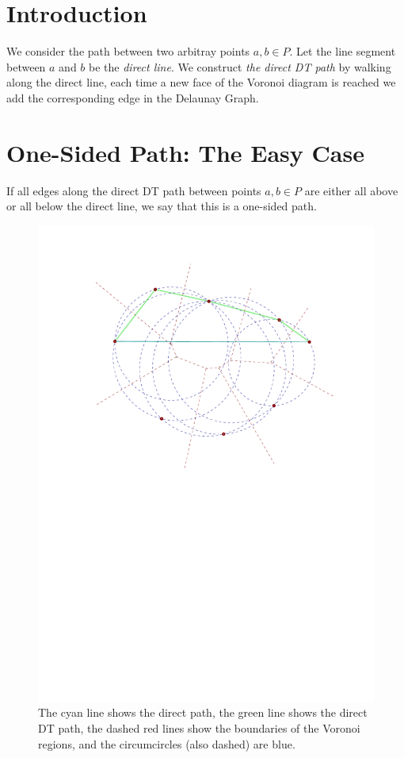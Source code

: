 \documentclass{tufte-handout}
\begin{document}
\section{Introduction}

We consider the path between two arbitray points $a,b \in P$.  Let the
line segment between $a$ and $b$ be the \emph{direct line}.  We
construct \emph{the direct DT path} by walking along the direct line,
each time a new face of the Voronoi diagram is reached we add the
corresponding edge in the Delaunay Graph.

\section{One-Sided Path: The Easy Case}

If all edges along the direct DT path between points $a,b \in P$ are
either all above or all below the direct line, we say that this is a
one-sided path.

\begin{figure}
  \includegraphics[scale=1.0]{figures/one-sided_path.pdf}
  \caption{The cyan line shows the direct path, the green line shows
    the direct DT path, the dashed red lines show the boundaries of
    the Voronoi regions, and the circumcircles (also dashed) are
    blue.}
\end{figure}
\end{document}
